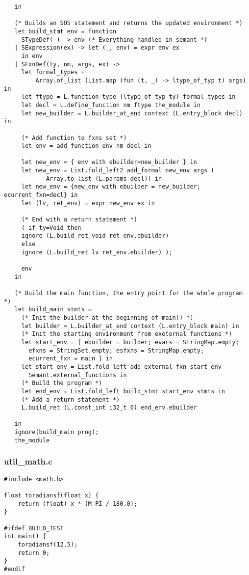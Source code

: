 \documentclass[main.tex]{subfiles}
\begin{document}
\begin{lstlisting}
   in

   (* Builds an SOS statement and returns the updated environment *)
   let build_stmt env = function
     STypeDef(_) -> env (* Everything handled in semant *)
   | SExpression(ex) -> let (_, env) = expr env ex 
     in env
   | SFxnDef(ty, nm, args, ex) ->
     let formal_types =
         Array.of_list (List.map (fun (t, _) -> ltype_of_typ t) args) in
     let ftype = L.function_type (ltype_of_typ ty) formal_types in
     let decl = L.define_function nm ftype the_module in
     let new_builder = L.builder_at_end context (L.entry_block decl) in

     (* Add function to fxns set *)
     let env = add_function env nm decl in

     let new_env = { env with ebuilder=new_builder } in
     let new_env = List.fold_left2 add_formal new_env args (
            Array.to_list (L.params decl)) in
     let new_env = {new_env with ebuilder = new_builder; ecurrent_fxn=decl} in
     let (lv, ret_env) = expr new_env ex in
     
     (* End with a return statement *)
     ( if ty=Void then
     ignore (L.build_ret_void ret_env.ebuilder)
     else
     ignore (L.build_ret lv ret_env.ebuilder) );

     env
   in
  
   (* Build the main function, the entry point for the whole program *)
   let build_main stmts = 
     (* Init the builder at the beginning of main() *)
     let builder = L.builder_at_end context (L.entry_block main) in
     (* Init the starting environment from exeternal functions *)
     let start_env = { ebuilder = builder; evars = StringMap.empty;
       efxns = StringSet.empty; esfxns = StringMap.empty; 
       ecurrent_fxn = main } in
     let start_env = List.fold_left add_external_fxn start_env
       Semant.external_functions in
     (* Build the program *)
     let end_env = List.fold_left build_stmt start_env stmts in
     (* Add a return statement *)
     L.build_ret (L.const_int i32_t 0) end_env.ebuilder    

   in
   ignore(build_main prog);
   the_module
\end{lstlisting}

\subsubsection{util\_math.c}
\begin{lstlisting}
#include <math.h>

float toradiansf(float x) {
    return (float) x * (M_PI / 180.0);
} 

#ifdef BUILD_TEST
int main() {
    toradiansf(12.5);
    return 0;
}
#endif
\end{lstlisting}
\end{document}
